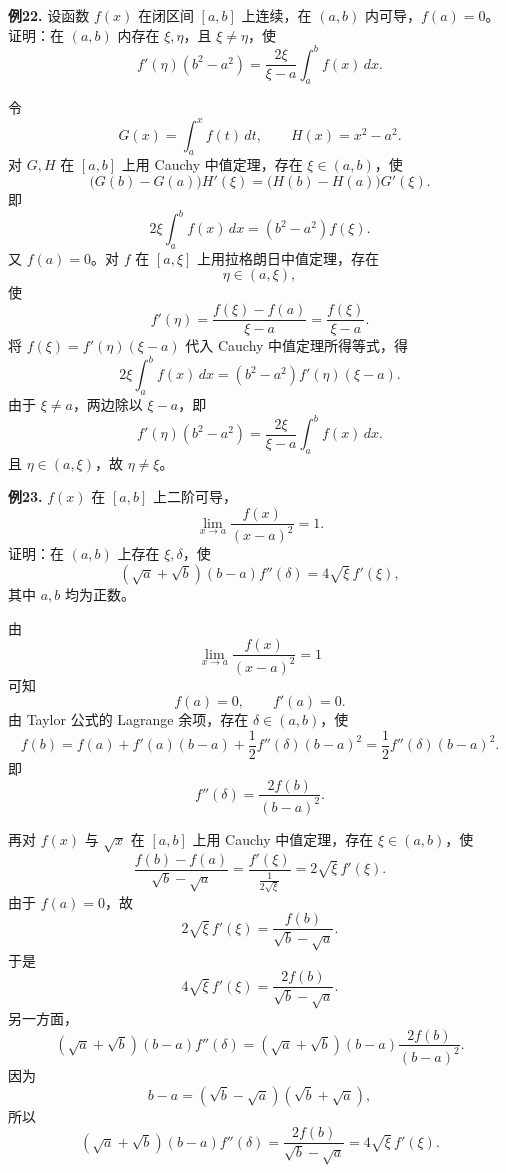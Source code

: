 \begin{problemblock}
\textbf{例22.} 设函数 \(f(x)\) 在闭区间 \([a,b]\) 上连续，在 \((a,b)\) 内可导，\(f(a)=0\)。证明：在 \((a,b)\) 内存在 \(\xi,\eta\)，且 \(\xi\ne\eta\)，使
\[
f'(\eta)(b^2-a^2)=\frac{2\xi}{\xi-a}\int_a^b f(x)\,dx.
\]
\end{problemblock}
\begin{solutionblock}
令
\[
G(x)=\int_a^x f(t)\,dt,\qquad H(x)=x^2-a^2.
\]
对 \(G,H\) 在 \([a,b]\) 上用 Cauchy 中值定理，存在 \(\xi\in(a,b)\)，使
\[
\bigl(G(b)-G(a)\bigr)H'(\xi)
=\bigl(H(b)-H(a)\bigr)G'(\xi).
\]
即
\[
2\xi\int_a^b f(x)\,dx
=(b^2-a^2)f(\xi).
\]
又 \(f(a)=0\)。对 \(f\) 在 \([a,\xi]\) 上用拉格朗日中值定理，存在
\[
\eta\in(a,\xi),
\]
使
\[
f'(\eta)=\frac{f(\xi)-f(a)}{\xi-a}
=\frac{f(\xi)}{\xi-a}.
\]
将 \(f(\xi)=f'(\eta)(\xi-a)\) 代入 Cauchy 中值定理所得等式，得
\[
2\xi\int_a^b f(x)\,dx
=(b^2-a^2)f'(\eta)(\xi-a).
\]
由于 \(\xi\ne a\)，两边除以 \(\xi-a\)，即
\[
f'(\eta)(b^2-a^2)=\frac{2\xi}{\xi-a}\int_a^b f(x)\,dx.
\]
且 \(\eta\in(a,\xi)\)，故 \(\eta\ne\xi\)。
\end{solutionblock}

\begin{problemblock}
\textbf{例23.} \(f(x)\) 在 \([a,b]\) 上二阶可导，
\[
\lim_{x\to a}\frac{f(x)}{(x-a)^2}=1.
\]
证明：在 \((a,b)\) 上存在 \(\xi,\delta\)，使
\[
(\sqrt a+\sqrt b)(b-a)f''(\delta)=4\sqrt{\xi}\,f'(\xi),
\]
其中 \(a,b\) 均为正数。
\end{problemblock}
\begin{solutionblock}
由
\[
\lim_{x\to a}\frac{f(x)}{(x-a)^2}=1
\]
可知
\[
f(a)=0,\qquad f'(a)=0.
\]
由 Taylor 公式的 Lagrange 余项，存在 \(\delta\in(a,b)\)，使
\[
f(b)=f(a)+f'(a)(b-a)+\frac12 f''(\delta)(b-a)^2
=\frac12 f''(\delta)(b-a)^2.
\]
即
\[
f''(\delta)=\frac{2f(b)}{(b-a)^2}.
\]

再对 \(f(x)\) 与 \(\sqrt x\) 在 \([a,b]\) 上用 Cauchy 中值定理，存在 \(\xi\in(a,b)\)，使
\[
\frac{f(b)-f(a)}{\sqrt b-\sqrt a}
=\frac{f'(\xi)}{\frac1{2\sqrt{\xi}}}
=2\sqrt{\xi}\,f'(\xi).
\]
由于 \(f(a)=0\)，故
\[
2\sqrt{\xi}\,f'(\xi)=\frac{f(b)}{\sqrt b-\sqrt a}.
\]
于是
\[
4\sqrt{\xi}\,f'(\xi)=\frac{2f(b)}{\sqrt b-\sqrt a}.
\]
另一方面，
\[
(\sqrt a+\sqrt b)(b-a)f''(\delta)
=(\sqrt a+\sqrt b)(b-a)\frac{2f(b)}{(b-a)^2}.
\]
因为
\[
b-a=(\sqrt b-\sqrt a)(\sqrt b+\sqrt a),
\]
所以
\[
(\sqrt a+\sqrt b)(b-a)f''(\delta)
=\frac{2f(b)}{\sqrt b-\sqrt a}
=4\sqrt{\xi}\,f'(\xi).
\]
\end{solutionblock}


